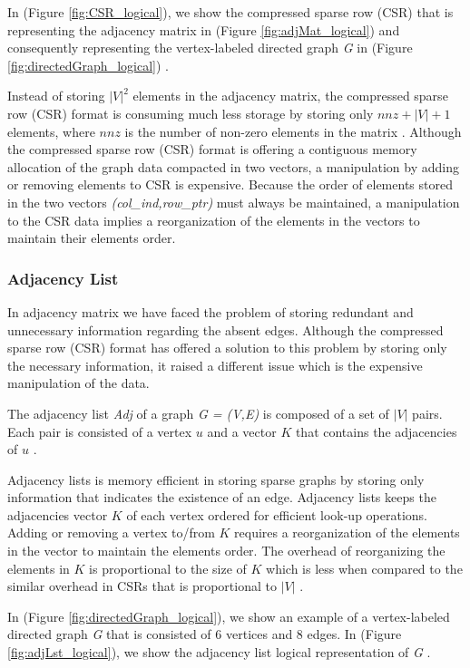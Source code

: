 {In (Figure \ref{fig:CSR_logical}), we show the compressed sparse row (CSR) that is representing the adjacency matrix in (Figure \ref{fig:adjMat_logical}) and consequently representing the vertex-labeled directed graph \textit{G} in (Figure \ref{fig:directedGraph_logical}) \cite{Bai:2000:TSA:357352}.

Instead of storing $|V|^2$ elements in the adjacency matrix, the compressed sparse row (CSR) format is consuming much less storage by storing only $nnz + |V| + 1$ elements, where $nnz$ is the number of non-zero elements in the matrix \cite{Bai:2000:TSA:357352}. Although the compressed sparse row (CSR) format is offering a contiguous memory allocation of the graph data compacted in two vectors, a manipulation by adding or removing elements to CSR is expensive. Because the order of elements stored in the two vectors \textit{(col\_ind,row\_ptr)} must always be maintained, a manipulation to the CSR data implies a reorganization of the elements in the vectors to maintain their elements order.

\subsubsection{Adjacency List}
\label{subsubsec:AdjacencyList}

In adjacency matrix we have faced the problem of storing redundant and unnecessary information regarding the absent edges. Although the compressed sparse row (CSR) format has offered a solution to this problem by storing only the necessary information, it raised a different issue which is the expensive manipulation of the data.

The adjacency list \textit{Adj} of a graph \textit{G = (V,E)} is composed of a set of $|V|$ pairs. Each pair is consisted of a vertex $u$ and a vector $K$ that contains the adjacencies of $u$ \cite{van1998python}.

Adjacency lists is memory efficient in storing sparse graphs by storing only information that indicates the existence of an edge. Adjacency lists keeps the adjacencies vector $K$ of each vertex ordered for efficient look-up operations. Adding or removing a vertex to/from $K$ requires a reorganization of the elements in the vector to maintain the elements order. The overhead of reorganizing the elements in $K$ is proportional to the size of $K$ which is less when compared to the similar overhead in CSRs that is proportional to $|V|$ \cite{van1998python}.

In (Figure \ref{fig:directedGraph_logical}), we show an example of a vertex-labeled directed graph \textit{G} that is consisted of 6 vertices and 8 edges. In (Figure \ref{fig:adjLst_logical}), we show the adjacency list logical representation of \textit{G} \cite{cormen2009introduction}. 

}

